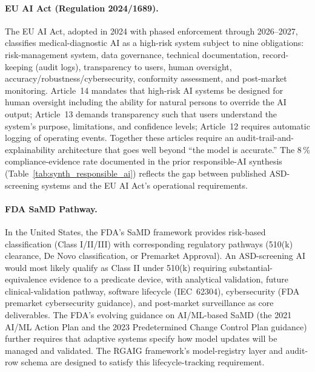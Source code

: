 \paragraph{EU AI Act (Regulation 2024/1689).}
The EU AI Act, adopted in 2024 with phased enforcement through 2026--2027, classifies medical-diagnostic AI as a high-risk system subject to nine obligations: risk-management system, data governance, technical documentation, record-keeping (audit logs), transparency to users, human oversight, accuracy/robustness/cybersecurity, conformity assessment, and post-market monitoring. Article~14 mandates that high-risk AI systems be designed for human oversight including the ability for natural persons to override the AI output; Article~13 demands transparency such that users understand the system's purpose, limitations, and confidence levels; Article~12 requires automatic logging of operating events. Together these articles require an audit-trail-and-explainability architecture that goes well beyond ``the model is accurate.'' The 8\,\% compliance-evidence rate documented in the prior responsible-AI synthesis (Table~\ref{tab:synth_responsible_ai}) reflects the gap between published ASD-screening systems and the EU AI Act's operational requirements.

\paragraph{FDA SaMD Pathway.}
In the United States, the FDA's SaMD framework provides risk-based classification (Class I/II/III) with corresponding regulatory pathways (510(k) clearance, De Novo classification, or Premarket Approval). An ASD-screening AI would most likely qualify as Class II under 510(k) requiring substantial-equivalence evidence to a predicate device, with analytical validation, future clinical-validation pathway, software lifecycle (IEC~62304), cybersecurity (FDA premarket cybersecurity guidance), and post-market surveillance as core deliverables. The FDA's evolving guidance on AI/ML-based SaMD (the 2021 AI/ML Action Plan and the 2023 Predetermined Change Control Plan guidance) further requires that adaptive systems specify how model updates will be managed and validated. The RGAIG framework's model-registry layer and audit-row schema are designed to satisfy this lifecycle-tracking requirement.

